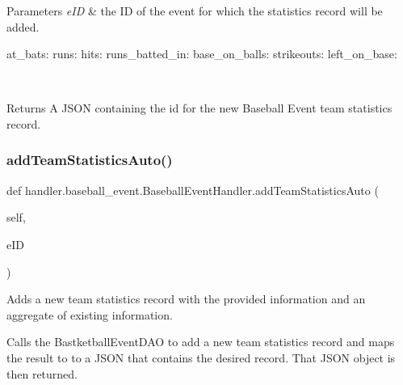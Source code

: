 \begin{DoxyParams}{Parameters}
{\em e\+ID} & the ID of the event for which the statistics record will be added. \begin{DoxyVerb}           at_bats:
           runs:
           hits:
           runs_batted_in:
           base_on_balls:
           strikeouts:
           left_on_base:
\end{DoxyVerb}
\\
\hline
\end{DoxyParams}
\begin{DoxyReturn}{Returns}
A J\+S\+ON containing the id for the new Baseball Event team statistics record. 
\end{DoxyReturn}
\mbox{\label{classhandler_1_1baseball__event_1_1_baseball_event_handler_a9e27b33f6b02e720e23cca07dbfd37d2}} 
\subsubsection{\texorpdfstring{add\+Team\+Statistics\+Auto()}{addTeamStatisticsAuto()}}
{\footnotesize\ttfamily def handler.\+baseball\+\_\+event.\+Baseball\+Event\+Handler.\+add\+Team\+Statistics\+Auto (\begin{DoxyParamCaption}\item[{}]{self,  }\item[{}]{e\+ID }\end{DoxyParamCaption})}



Adds a new team statistics record with the provided information and an aggregate of existing information. 

Calls the Bastketball\+Event\+D\+AO to add a new team statistics record and maps the result to to a J\+S\+ON that contains the desired record. That J\+S\+ON object is then returned.


